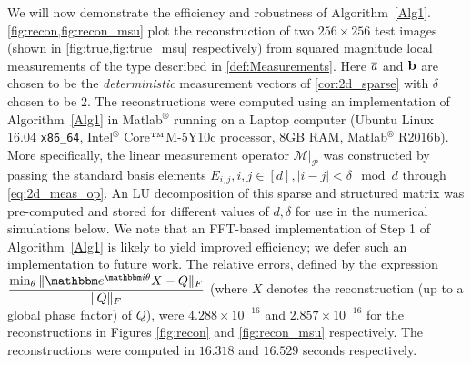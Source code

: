 We will now demonstrate the efficiency and robustness of Algorithm~\ref{Alg1}. \cref{fig:recon,fig:recon_msu} plot the reconstruction of two $256\times 256$ test images (shown in \cref{fig:true,fig:true_msu} respectively) from squared magnitude local measurements of the type described in \eqref{def:Measurements}.  Here $\overline{a}$ and $\mathbf b$ are chosen to be the {\em deterministic} measurement vectors of \cref{cor:2d_sparse} with $\delta$ chosen to be $2$.  The reconstructions were computed using an implementation of Algorithm~\ref{Alg1} in Matlab$^\circledR$ running on a Laptop computer (Ubuntu Linux 16.04 {\tt x86\_64}, Intel$^\circledR$ Core$^{\text{\tiny TM}}$M-5Y10c processor, 8GB RAM, Matlab$^\circledR$ R2016b).  More specifically, the linear measurement operator $\left. \mathcal M \right \vert_{\mathcal P}$ was constructed by passing the standard basis elements $E_{i,j}, i,j \in [d], |i-j|< \delta \mod d$ through \eqref{eq:2d_meas_op}.  An LU decomposition of this sparse and structured matrix was pre-computed and stored for different values of $d,\delta$ for use in the numerical simulations below.  We note that an FFT-based implementation of Step 1 of Algorithm~\ref{Alg1} is likely to yield improved efficiency; we defer such an implementation to future work.  The relative errors, defined by the expression $\displaystyle \frac{\min_\theta\Vert \mathbbm e^{\mathbbm i \theta} X-Q\Vert_F}{\Vert Q\Vert_F}$ (where $X$ denotes the reconstruction (up to a global phase factor) of $Q$), were $4.288\times 10^{-16}$ and $2.857\times 10^{-16}$ for the reconstructions in Figures \ref{fig:recon} and \ref{fig:recon_msu} respectively.  The reconstructions were computed in $16.318$ and $16.529$ seconds respectively.
%
